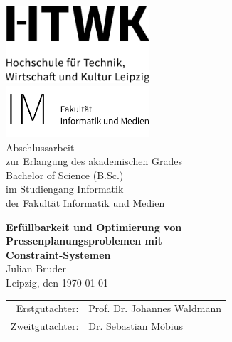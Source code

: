 
\begin{titlepage}
    \vbox{ }
    \vbox{ }
    \begin{center}

        \includegraphics[width=0.40\textwidth, center]{Images/HTWK_Zusatz_de_V_Black}\\[1cm]
        \includegraphics[width=0.40\textwidth, center]{Images/HTWK-Fakultaetszusatz_im_schwarz_de}\\[1cm]

        {\Large Abschlussarbeit}\\[10pt]
        {\Large zur Erlangung des akademischen Grades}\\[20pt]
        {\Large Bachelor of Science (B.Sc.)}\\[20pt]
        {\Large im Studiengang Informatik}\\[10pt]
        {\Large der Fakultät Informatik und Medien}\\[40pt]
        \vbox{}

        {\huge \textbf{Erfüllbarkeit und Optimierung von}}\\[10pt]
        {\huge \textbf{Pressenplanungsproblemen mit}}\\[10pt]
        {\huge \textbf{Constraint-Systemen}}\\[40pt]
        {\Large Julian Bruder}\\[10pt]
        {\Large Leipzig, den \today}\\[40pt]
        \vfill
        \begin{tabular}{rl}
            \Large Erstgutachter:  & \Large Prof. Dr. Johannes Waldmann\\[10pt]
            \Large Zweitgutachter: & \Large Dr. Sebastian Möbius\\
        \end{tabular}
    \end{center}
\end{titlepage}
